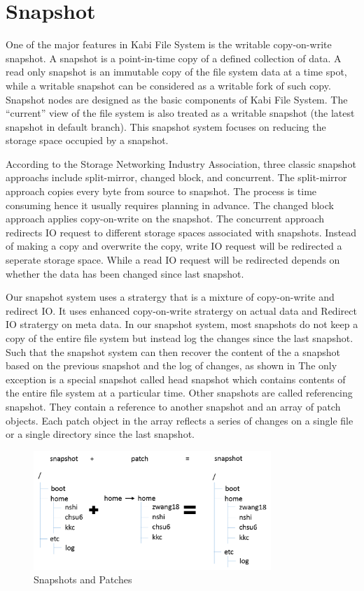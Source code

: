 \chapter{Snapshot}
\label{chap:snapshot}

    One of the major features in Kabi File System is the writable copy-on-write snapshot. A snapshot is a point-in-time copy of a defined collection of data.\cite{snapshot_def} A read only snapshot is an immutable copy of the file system data at a time spot, while a writable snapshot can be considered as a writable fork of such copy. Snapshot nodes are designed as the basic components of Kabi File System. The ``current'' view of the file system is also treated as a writable snapshot (the latest snapshot in default branch). This snapshot system focuses on reducing the storage space occupied by a snapshot.

    According to the Storage Networking Industry Association, three classic snapshot approachs include split-mirror, changed block, and concurrent.\cite{snapshot_types} The split-mirror approach copies every byte from source to snapshot. The process is time consuming hence it usually requires planning in advance. The changed block approach applies copy-on-write on the snapshot. The concurrent approach redirects IO request to different storage spaces associated with snapshots. Instead of making a copy and overwrite the copy, write IO request will be redirected a seperate storage space. While a read IO request will be redirected depends on whether the data has been changed since last snapshot.

    Our snapshot system uses a stratergy that is a mixture of copy-on-write and redirect IO. It uses enhanced copy-on-write stratergy on actual data and Redirect IO stratergy on meta data. In our snapshot system, most snapshots do not keep a copy of the entire file system but instead log the changes since the last snapshot. Such that the snapshot system can then recover the content of the a snapshot based on the previous snapshot and the log of changes, as shown in  The only exception is a special snapshot called head snapshot which contains contents of the entire file system at a particular time. Other snapshots are called referencing snapshot. They contain a reference to another snapshot and an array of patch objects. Each patch object in the array reflects a series of changes on a single file or a single directory since the last snapshot.

\begin{figure}[hbtp]
\centering
\includegraphics[width=0.8\textwidth]{Chapter-4/figs/fig23.png}
\caption{Snapshots and Patches}
\label{fig:snapshot_patch}
\end{figure}

